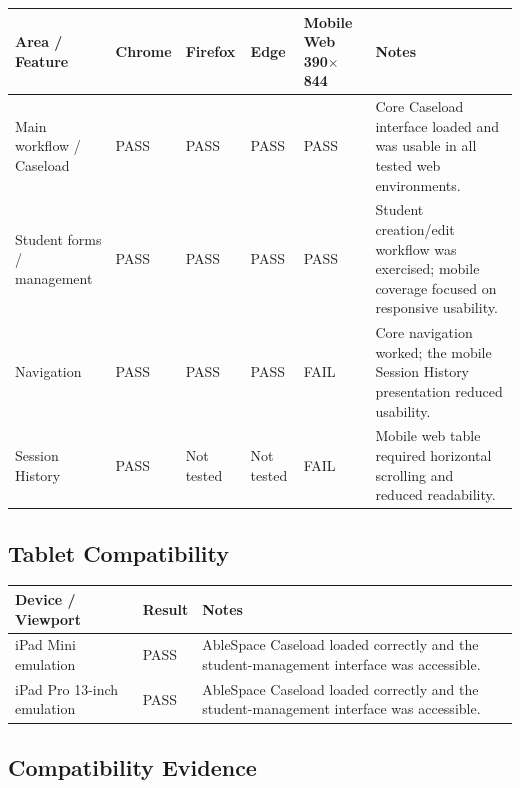 \documentclass[11pt,a4paper]{article}
\begin{document}
\begin{center}
\small
\begin{tabularx}{\textwidth}{>{\raggedright\arraybackslash}p{}*{4}{>{\centering\arraybackslash}p{}}>{\raggedright\arraybackslash}X}
\toprule
\textbf{Area / Feature} & \textbf{Chrome} & \textbf{Firefox} & \textbf{Edge} & \textbf{Mobile Web 390$\times$844} & \textbf{Notes} \\
\midrule
Main workflow / Caseload & PASS & PASS & PASS & PASS & Core Caseload interface loaded and was usable in all tested web environments. \\
Student forms / management & PASS & PASS & PASS & PASS & Student creation/edit workflow was exercised; mobile coverage focused on responsive usability. \\
Navigation & PASS & PASS & PASS & FAIL & Core navigation worked; the mobile Session History presentation reduced usability. \\
Session History & PASS & Not tested & Not tested & FAIL & Mobile web table required horizontal scrolling and reduced readability. \\
\bottomrule
\end{tabularx}
\end{center}

\subsection{Tablet Compatibility}

\begin{center}
\small
\begin{tabularx}{0.78\textwidth}{>{\raggedright\arraybackslash}p{}>{\centering\arraybackslash}p{}X}
\toprule
\textbf{Device / Viewport} & \textbf{Result} & \textbf{Notes} \\
\midrule
iPad Mini emulation & PASS & AbleSpace Caseload loaded correctly and the student-management interface was accessible. \\
iPad Pro 13-inch emulation & PASS & AbleSpace Caseload loaded correctly and the student-management interface was accessible. \\
\bottomrule
\end{tabularx}
\end{center}

\subsection{Compatibility Evidence}
\end{document}

